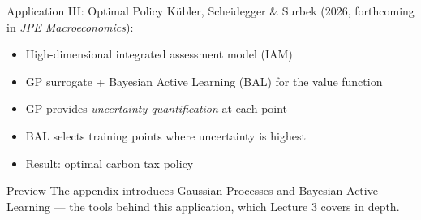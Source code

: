 \documentclass[aspectratio=169,11pt]{beamer}
\newcommand{\emphc}[1]{\textcolor{harvardcrimson}{#1}}
\begin{document}
\begin{frame}{Application III: Optimal Policy}
K\"ubler, Scheidegger \& Surbek (2026, forthcoming in \emph{JPE Macroeconomics}):

\vspace{0.3cm}
\begin{itemize}
  \item High-dimensional integrated assessment model (IAM)
  \item \emphc{GP surrogate + Bayesian Active Learning (BAL)} for the value function
  \item GP provides \emph{uncertainty quantification} at each point
  \item BAL selects training points where uncertainty is highest
  \item Result: optimal carbon tax policy
\end{itemize}

\vspace{0.3cm}
\begin{alertblock}{Preview}
The appendix introduces \emphc{Gaussian Processes} and \emphc{Bayesian Active Learning} --- the tools behind this application, which Lecture 3 covers in depth.
\end{alertblock}
\end{frame}
\end{document}
